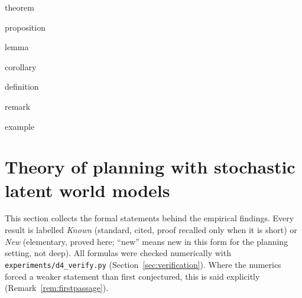 \ifcsname theorem\endcsname\else\newtheorem{theorem}{Theorem}\fi
\ifcsname proposition\endcsname\else\newtheorem{proposition}[theorem]{Proposition}\fi
\ifcsname lemma\endcsname\else\newtheorem{lemma}[theorem]{Lemma}\fi
\ifcsname corollary\endcsname\else\newtheorem{corollary}[theorem]{Corollary}\fi
\ifcsname definition\endcsname\else\newtheorem{definition}[theorem]{Definition}\fi
\ifcsname remark\endcsname\else\newtheorem{remark}[theorem]{Remark}\fi
\ifcsname example\endcsname\else\newtheorem{example}[theorem]{Example}\fi
\providecommand{\EE}{\mathbb{E}}
\providecommand{\PP}{\mathbb{P}}
\providecommand{\RR}{\mathbb{R}}
\providecommand{\Var}{\operatorname{Var}}
\providecommand{\tr}{\operatorname{tr}}
\providecommand{\CVaR}{\operatorname{CVaR}}
\providecommand{\VaR}{\operatorname{VaR}}
\providecommand{\Bin}{\operatorname{Bin}}
\providecommand{\osc}{\operatorname{osc}}
\providecommand{\ES}{\operatorname{ES}}
\providecommand{\indic}{\mathbf 1}
\providecommand{\Nrm}{\mathcal{N}}
\providecommand{\Phibar}{\bar\Phi}

\section{Theory of planning with stochastic latent world models}\label{sec:theory}

This section collects the formal statements behind the empirical findings.
Every result is labelled \emph{Known} (standard, cited, proof recalled only when it is short) or \emph{New} (elementary, proved here;
``new'' means new in this form for the planning setting, not deep).
All formulas were checked numerically with \texttt{experiments/d4\_verify.py} (Section~\ref{sec:verification}).
Where the numerics forced a weaker statement than first conjectured, this is said explicitly (Remark~\ref{rem:firstpassage}).

